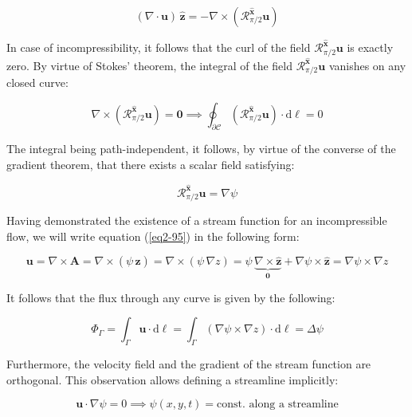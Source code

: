 \begin{equation}
   (\nabla\cdot\mathbf{u})\,\mathbf{\hat{z}}=-\nabla\times(\mathcal{R}^\mathbf{\hat{x}}_{\pi/2}\mathbf{u})
\end{equation}

In case of incompressibility, it follows that the curl of the field $\mathcal{R}^\mathbf{\hat{x}}_{\pi/2}\mathbf{u}$ is exactly zero. By virtue of Stokes' theorem, the integral of the field $\mathcal{R}^\mathbf{\hat{x}}_{\pi/2}\mathbf{u}$ vanishes on any closed curve:

\begin{equation}
    \nabla\times\left(\mathcal{R}^\mathbf{\hat{x}}_{\pi/2}\mathbf{u}\right)=\mathbf{0}\implies\oint_{\partial\mathcal{C}}(\mathcal{R}^\mathbf{\hat{x}}_{\pi/2}\mathbf{u})\cdot\mathrm{d}\boldsymbol{\ell}=0
\end{equation}

The integral being path-independent, it follows, by virtue of the converse of the gradient theorem, that there exists a scalar field satisfying:

\begin{equation}
    \label{eq2-95}
    \mathcal{R}^\mathbf{\hat{x}}_{\pi/2}\mathbf{u}=\nabla\psi
\end{equation}

Having demonstrated the existence of a stream function for an incompressible flow, we will write equation (\ref{eq2-95}) in the following form:

\begin{equation}
    \label{eq2-96}
    \mathbf{u}=\nabla\times\mathbf{A}=\nabla\times\left(\psi\,\mathbf{\hat{z}}\right)=\nabla\times\left(\psi\,\nabla z\right)=\psi \,\underbrace{\nabla\times\mathbf{\hat{z}}}_\mathbf{0}+\nabla\psi\times\mathbf{\hat{z}}=\nabla\psi\times\nabla z
\end{equation}

It follows that the flux through any curve is given by the following:

\begin{equation}
    \label{eq2-98}
    \Phi_\Gamma=\int_\Gamma\mathbf{u}\cdot\mathrm{d}\boldsymbol{\ell}=\int_\Gamma\left(\nabla\psi\times\nabla z\right)\cdot\mathrm{d}\boldsymbol{\ell}=\Delta\psi
\end{equation}

Furthermore, the velocity field and the gradient of the stream function are orthogonal. This observation allows defining a streamline implicitly:

\begin{equation}
    \label{eq2-99}
    \mathbf{u}\cdot\nabla\psi=0\implies\psi(x,y,t)=\text{const. along a streamline}
\end{equation}

